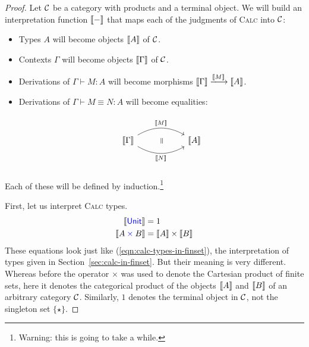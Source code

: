 \begin{proof}
  Let \(\mathcal C\) be a category with products and a terminal object.
  We will build an interpretation function \(\left\llbracket -\right\rrbracket\)
  that maps each of the judgments of \textsc{Calc}
  into \(\mathcal C\):
  \begin{itemize}
  \item Types \(A\) will become objects \(\left\llbracket A\right\rrbracket\) of \(\mathcal C\).
  \item Contexts \(\Gamma\) will become objects \(\left\llbracket \Gamma\right\rrbracket\) of \(\mathcal C\).
  \item Derivations of \(\Gamma \vdash M : A\) will become
    morphisms \(\llbr{\Gamma} \xlongrightarrow{\llbr{M}} \llbr{A}\).
  \item Derivations of \(\Gamma \vdash M \equiv N : A\) will become
    equalities:
    \[%
\begin{tikzcd}
                                                                                    & {} \arrow[dd, "~\rotatebox{90}{\(=\)}", phantom] &          \\
\llbr{\Gamma} \arrow[rr, "\llbr{M}", bend left] \arrow[rr, "\llbr{N}"', bend right] &                                                  & \llbr{A} \\
                                                                                    & {}                                               &
\end{tikzcd}\]
  \end{itemize}
  Each of these will be defined by induction.\footnote{
  Warning: this is going to take a while.
  }

  First, let us interpret \textsc{Calc} types.
  \begin{align}
    \left\llbracket \mathsf{{\color{blue}Unit}}\right\rrbracket &= 1 \\
    \left\llbracket A \mathbin{{\color{blue}\times}} B\right\rrbracket &= \left\llbracket A\right\rrbracket \times \left\llbracket B\right\rrbracket
  \end{align}
  These equations look just like
  (\ref{eqn:calc-types-in-finset}), the interpretation
  of types given in Section~\ref{sec:calc-in-finset}.
  But their meaning is very different.
  Whereas before the operator \(\times\) was used
  to denote the Cartesian product of finite sets,
  here it denotes the categorical
  product of the objects \(\left\llbracket A\right\rrbracket\) and \(\left\llbracket B\right\rrbracket\)
  of an arbitrary category \(\mathcal C\).
  Similarly, \(1\) denotes the terminal object in \(\mathcal C\),
  not the singleton set \(\{\star\}\).


\end{proof}
